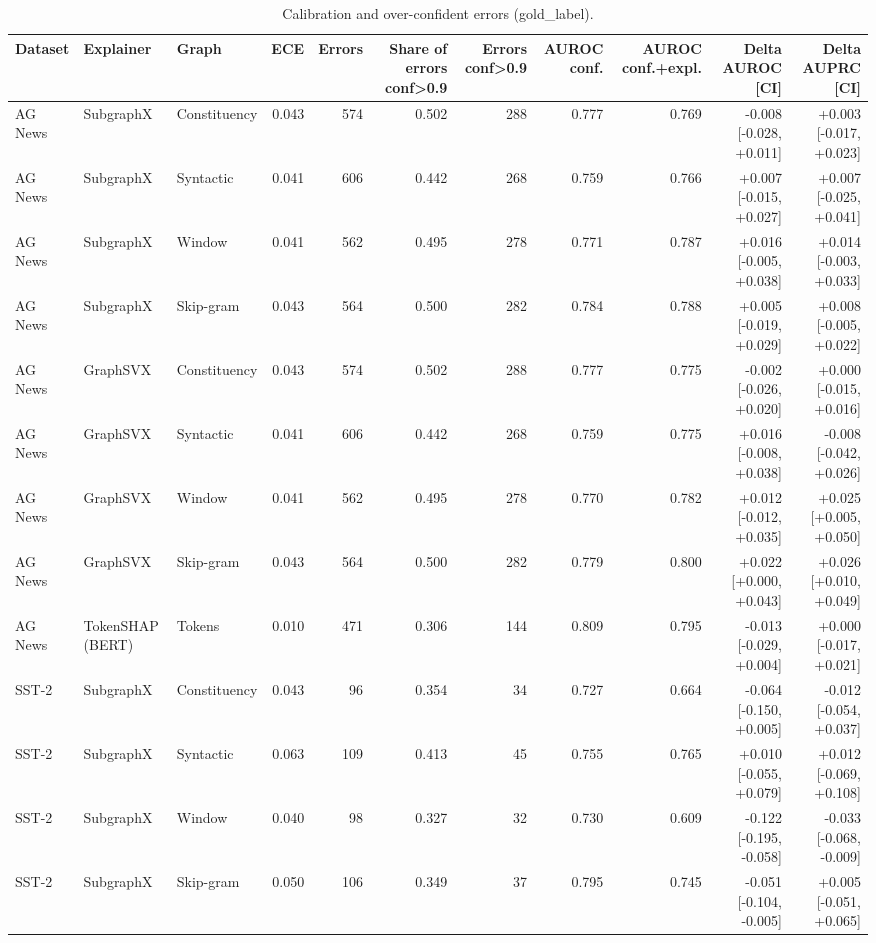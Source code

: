 \begin{table}[H]
\centering
\small
\caption{Calibration and over-confident errors (gold_label).}
\label{tab:regime_gold_label}
\begin{tabular}{lllrrrrrrrr}
\toprule
Dataset & Explainer & Graph & ECE & Errors & Share of errors conf>0.9 & Errors conf>0.9 & AUROC conf. & AUROC conf.+expl. & Delta AUROC [CI] & Delta AUPRC [CI] \\
\midrule
AG News & SubgraphX & Constituency & 0.043 & 574 & 0.502 & 288 & 0.777 & 0.769 & -0.008 [-0.028, +0.011] & +0.003 [-0.017, +0.023] \\
AG News & SubgraphX & Syntactic & 0.041 & 606 & 0.442 & 268 & 0.759 & 0.766 & +0.007 [-0.015, +0.027] & +0.007 [-0.025, +0.041] \\
AG News & SubgraphX & Window & 0.041 & 562 & 0.495 & 278 & 0.771 & 0.787 & +0.016 [-0.005, +0.038] & +0.014 [-0.003, +0.033] \\
AG News & SubgraphX & Skip-gram & 0.043 & 564 & 0.500 & 282 & 0.784 & 0.788 & +0.005 [-0.019, +0.029] & +0.008 [-0.005, +0.022] \\
AG News & GraphSVX & Constituency & 0.043 & 574 & 0.502 & 288 & 0.777 & 0.775 & -0.002 [-0.026, +0.020] & +0.000 [-0.015, +0.016] \\
AG News & GraphSVX & Syntactic & 0.041 & 606 & 0.442 & 268 & 0.759 & 0.775 & +0.016 [-0.008, +0.038] & -0.008 [-0.042, +0.026] \\
AG News & GraphSVX & Window & 0.041 & 562 & 0.495 & 278 & 0.770 & 0.782 & +0.012 [-0.012, +0.035] & +0.025 [+0.005, +0.050] \\
AG News & GraphSVX & Skip-gram & 0.043 & 564 & 0.500 & 282 & 0.779 & 0.800 & +0.022 [+0.000, +0.043] & +0.026 [+0.010, +0.049] \\
AG News & TokenSHAP (BERT) & Tokens & 0.010 & 471 & 0.306 & 144 & 0.809 & 0.795 & -0.013 [-0.029, +0.004] & +0.000 [-0.017, +0.021] \\
SST-2 & SubgraphX & Constituency & 0.043 & 96 & 0.354 & 34 & 0.727 & 0.664 & -0.064 [-0.150, +0.005] & -0.012 [-0.054, +0.037] \\
SST-2 & SubgraphX & Syntactic & 0.063 & 109 & 0.413 & 45 & 0.755 & 0.765 & +0.010 [-0.055, +0.079] & +0.012 [-0.069, +0.108] \\
SST-2 & SubgraphX & Window & 0.040 & 98 & 0.327 & 32 & 0.730 & 0.609 & -0.122 [-0.195, -0.058] & -0.033 [-0.068, -0.009] \\
SST-2 & SubgraphX & Skip-gram & 0.050 & 106 & 0.349 & 37 & 0.795 & 0.745 & -0.051 [-0.104, -0.005] & +0.005 [-0.051, +0.065] \\

\end{tabular}
\end{table}
